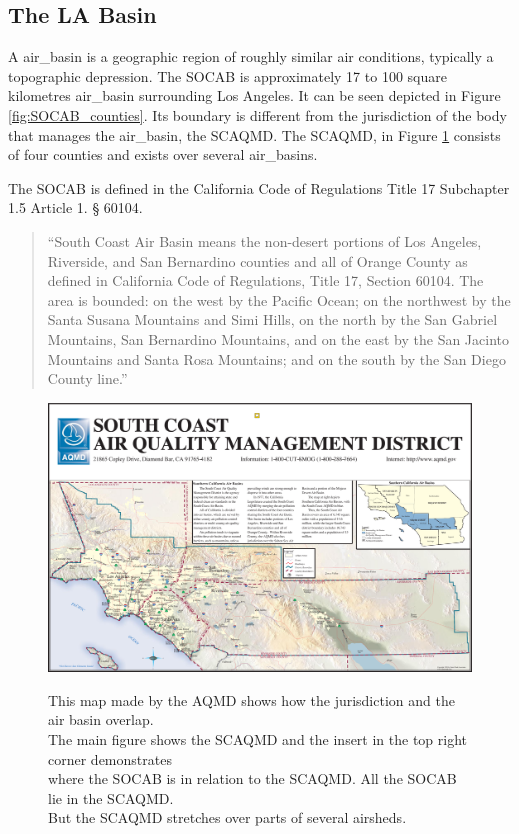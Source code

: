 \subsection{The LA Basin} \label{subsec:labasin}
A \gls{air_basin} is a geographic region of roughly similar air conditions, typically a topographic depression.  The \ac{SOCAB} is approximately 17 to 100 square kilometres \gls{air_basin} surrounding Los Angeles.  It can be seen depicted in Figure \ref{fig:SOCAB_counties}.  Its boundary is different from the jurisdiction of the body that manages the \gls{air_basin}, the \ac{SCAQMD}. The \ac{SCAQMD}, in Figure \ref{fig:SCAQMD-jurisdiction} consists of four counties and exists over several \glspl{air_basin}.  


The \ac{SOCAB} is defined in the California Code of Regulations Title 17  Subchapter 1.5  Article 1.  § 60104.   
\begin{quote}
	``South Coast Air Basin means the non-desert portions of Los Angeles, Riverside, and San Bernardino counties and all of Orange County as defined in California Code of Regulations, Title 17, Section 60104. The area is bounded: on the west by the Pacific Ocean; on the northwest by the Santa Susana Mountains and Simi Hills, on the north by the San Gabriel Mountains, San Bernardino Mountains, and on the east by the San Jacinto Mountains and Santa Rosa Mountains; and on the south by the San Diego County line.''
	
\end{quote}

\begin{landscape}
	\begin{figure}[ht]
		\captionsetup{justification=centering}
		\caption{This map made by the \ac{AQMD} shows how the jurisdiction and the air basin overlap.\\  The main figure shows the \ac{SCAQMD} and the insert in the top right corner demonstrates \\where the \ac{SOCAB} is in relation to the \ac{SCAQMD}. All the \ac{SOCAB} lie in the \ac{SCAQMD}.\\ But the \ac{SCAQMD} stretches over parts of several airsheds.  
		}
		\centering
		\includegraphics[width = \textwidth]{Figures/map-of-jurisdiction.pdf}
		\label{fig:SCAQMD-jurisdiction}
	\end{figure}
\end{landscape}


